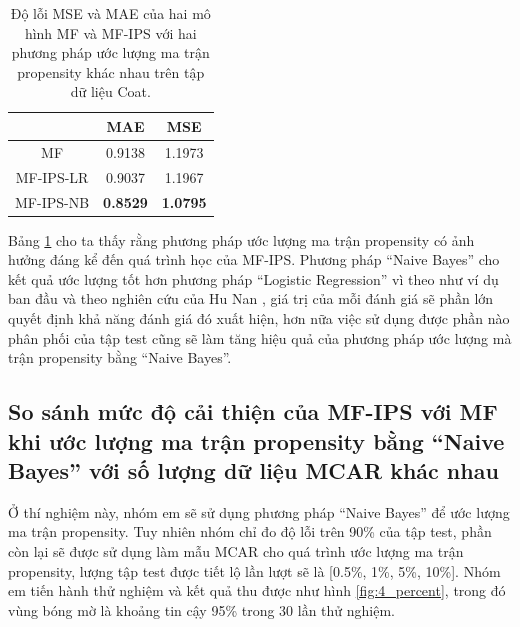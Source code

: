 \begin{table}[h]
\centering
\begin{tabular}{|c|c|c|}
\hline
\multicolumn{1}{|l|}{} & MAE             & MSE             \\ \hline
MF                     & 0.9138          & 1.1973          \\ \hline
MF-IPS-LR              & 0.9037          & 1.1967          \\ \hline
MF-IPS-NB              & \textbf{0.8529} & \textbf{1.0795} \\ \hline
\end{tabular}
    \caption{Độ lỗi MSE và MAE của hai mô hình MF và MF-IPS với hai phương pháp ước lượng ma trận propensity khác nhau trên tập dữ liệu Coat.}
    \label{table:4_approach_estimate}
\end{table}

Bảng \ref{table:4_approach_estimate} cho ta thấy rằng phương pháp ước lượng ma trận propensity có ảnh hưởng đáng kể đến quá trình học của MF-IPS. Phương pháp ``Naive Bayes'' cho kết quả ước lượng tốt hơn phương pháp ``Logistic Regression'' vì theo như ví dụ ban đầu và theo nghiên cứu của Hu Nan \cite{bias_2017}, giá trị của mỗi đánh giá sẽ phần lớn quyết định khả năng đánh giá đó xuất hiện, hơn nữa việc sử dụng được phần nào phân phối của tập test cũng sẽ làm tăng hiệu quả của phương pháp ước lượng mà trận propensity bằng ``Naive Bayes''.

\subsection{So sánh mức độ cải thiện của MF-IPS với MF khi ước lượng ma trận propensity bằng ``Naive Bayes'' với số lượng dữ liệu MCAR khác nhau}
Ở thí nghiệm này, nhóm em sẽ sử dụng phương pháp ``Naive Bayes'' để ước lượng ma trận propensity. Tuy nhiên nhóm chỉ đo độ lỗi trên 90\% của tập test, phần còn lại sẽ được sử dụng làm mẫu MCAR cho quá trình ước lượng ma trận propensity, lượng tập test được tiết lộ lần lượt sẽ là [0.5\%, 1\%, 5\%, 10\%]. Nhóm em tiến hành thử nghiệm và kết quả thu được như hình \ref{fig:4_percent}, trong đó vùng bóng mờ là khoảng tin cậy 95\% trong 30 lần thử nghiệm.


